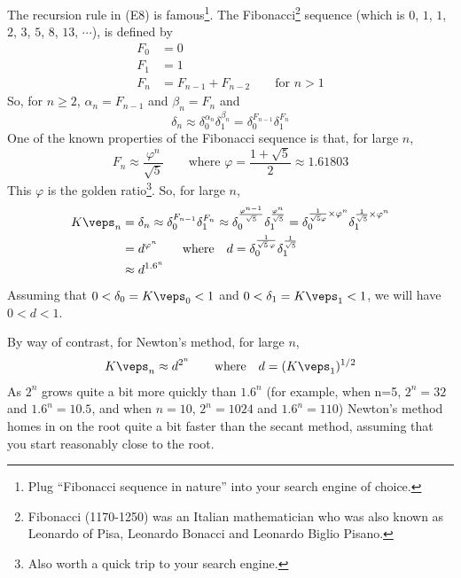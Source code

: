 The recursion rule in (E8) is famous\footnote{Plug ``Fibonacci sequence in nature'' into your search engine of choice.}. The 
Fibonacci\footnote{Fibonacci (1170-1250) was an Italian mathematician who was also known as Leonardo of Pisa, Leonardo Bonacci and Leonardo Biglio Pisano.} 
sequence (which is $0$, $1$, $1$, $2$, $3$, $5$, $8$, $13$, $\cdots$), 
is defined by 
\begin{align*}
F_0&=0 \\ 
F_1&=1 \\ 
F_n&=F_{n-1}+F_{n-2}\qquad\text{for }n>1
\end{align*}
So, for $n\ge 2$, $\alpha_n = F_{n-1}$ and $\beta_n=F_n$ and
\begin{equation*}
\delta_n \approx \delta_0^{\alpha_n}\delta_1^{\beta_n}
         = \delta_0^{F_{n-1}}\delta_1^{F_n}
\end{equation*}
One of the known properties of the Fibonacci sequence is that, for large $n$,
\begin{equation*}
F_n\approx\frac{\varphi^n}{\sqrt{5}}\qquad\text{where }
\varphi=\frac{1+\sqrt{5}}{2} \approx 1.61803 
\end{equation*}
This $\varphi$ is the golden ratio\footnote{Also worth a quick trip to your search engine.}. 
So, for large $n$,
\begin{align*}
K\veps_n &= \delta_n
         \approx \delta_0^{F_{n-1}}\delta_1^{F_n}
         \approx \delta_0^{\frac{\varphi^{n-1}}{\sqrt{5}}}
                               \delta_1^{\frac{\varphi^n}{\sqrt{5}}}
         = \delta_0^{\frac{1}{\sqrt{5}\varphi}\times\varphi^n}
                          \delta_1^{\frac{1}{\sqrt{5}}\times\varphi^n}
\\
&= d^{\varphi^n}\qquad\text{where}\quad
   d=\delta_0^{\frac{1}{\sqrt{5}\,\varphi}}\delta_1^{\frac{1}{\sqrt{5}}}
\\
&\approx d^{1.6^n}
\end{align*}
Assuming that $0<\delta_0=K\veps_0<1$ and $0<\delta_1=K\veps_1<1$,
we will have $0<d<1$. 

By way of contrast, for Newton's method, for large $n$,
\begin{align*}
K\veps_n\approx d^{2^n}\qquad\text{where}\quad
                d=(K\veps_1)^{1/2}
\end{align*}
As $2^n$ grows quite a bit more quickly than $1.6^n$ 
(for example, 
        when n=5, $2^n=32$ and $1.6^n=10.5$, 
    and when $n=10$, $2^n=1024$ and $1.6^n=110$)
Newton's method homes in on the root quite a bit faster than the secant method,
assuming that you start reasonably close to the root.
